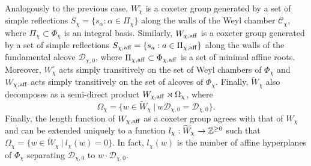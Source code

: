     Analogously to the previous case, $W_\chi^\circ$ is a coxeter group generated by a set of simple reflections $S_\chi=\{s_\alpha:\alpha\in\Pi_\chi\}$ along the walls of the Weyl chamber $\mathcal{C}_\chi$, where $\Pi_\chi\subset\Phi_\chi$ is an integral basis. Similarly, $W_{\chi,\mathrm{aff}}$ is a coxeter group generated by a set of simple reflections $S_{\chi,\mathrm{aff}}=\{s_a:a\in\Pi_{\chi,\mathrm{aff}}\}$ along the walls of the fundamental alcove $\mathcal{D}_{\chi,0}$, where $\Pi_{\chi,\mathrm{aff}}\subset\Phi_{\chi,\mathrm{aff}}$ is a set of minimal affine roots. Moreover, $W_\chi^\circ$ acts simply transitively on the set of Weyl chambers of $\Phi_\chi$ and $W_{\chi,\mathrm{aff}}$ acts simply transitively on the set of alcoves of $\Phi_\chi$. Finally, $\widetilde{W}_\chi$ also decomposes as a semi-direct product $W_{\chi,\mathrm{aff}}\rtimes\Omega_\chi$, where %
    $$\Omega_\chi=\{w\in\widetilde{W}_\chi\ |\ w\mathcal{D}_{\chi,0}=\mathcal{D}_{\chi,0}\}.$$
    Finally, the length function of $W_{\chi,\mathrm{aff}}$ as a coxeter group agrees with that of $W_\chi$ and can be extended uniquely to a function $l_\chi:\widetilde{W}_\chi\rightarrow\mathbb{Z}^{\geq0}$ such that $\Omega_\chi=\{w\in\widetilde{W}_\chi\ |\ l_\chi(w)=0\}$. In fact, $l_\chi(w)$ is the number of affine hyperplanes of $\Phi_\chi$ separating $\mathcal{D}_{\chi,0}$ to $w\cdot\mathcal{D}_{\chi,0}$.

